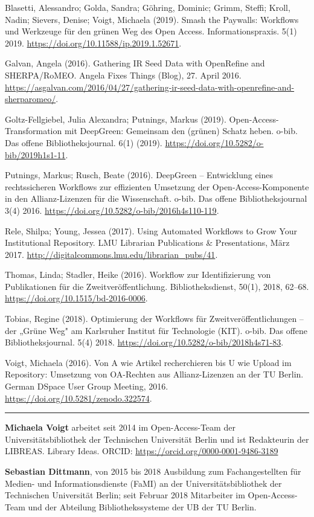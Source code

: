 \documentclass[a4paper,
fontsize=11pt,
oneside,
numbers=noperiodatend,
parskip=half-,
bibliography=totoc,
final
]{scrartcl}
\begin{document}
Blasetti, Alessandro; Golda, Sandra; Göhring, Dominic; Grimm, Steffi;
Kroll, Nadin; Sievers, Denise; Voigt, Michaela (2019). Smash the
Paywalls: Workflows und Werkzeuge für den grünen Weg des Open Access.
Informationspraxis. 5(1) 2019.
\url{https://doi.org/10.11588/ip.2019.1.52671}.

Galvan, Angela (2016). Gathering IR Seed Data with OpenRefine and
SHERPA/RoMEO. Angela Fixes Things (Blog), 27. April 2016.
\url{https://asgalvan.com/2016/04/27/gathering-ir-seed-data-with-openrefine-and-sherparomeo/}.

Goltz-Fellgiebel, Julia Alexandra; Putnings, Markus (2019).
Open-Access-Transformation mit DeepGreen: Gemeinsam den (grünen) Schatz
heben. o-bib. Das offene Bibliotheksjournal. 6(1) (2019).
\url{https://doi.org/10.5282/o-bib/2019h1s1-11}.

Putnings, Markus; Rusch, Beate (2016). DeepGreen -- Entwicklung eines
rechtssicheren Workflows zur effizienten Umsetzung der
Open-Access-Komponente in den Allianz-Lizenzen für die Wissenschaft.
o-bib. Das offene Bibliotheksjournal 3(4) 2016.
\url{https://doi.org/10.5282/o-bib/2016h4s110-119}.

Rele, Shilpa; Young, Jessea (2017). Using Automated Workflows to Grow
Your Institutional Repository. LMU Librarian Publications \&
Presentations, März 2017.
\url{http://digitalcommons.lmu.edu/librarian_pubs/41}.

Thomas, Linda; Stadler, Heike (2016). Workflow zur Identifizierung von
Publikationen für die Zweitveröffentlichung. Bibliotheksdienst, 50(1),
2018, 62--68. \url{https://doi.org/10.1515/bd-2016-0006}.

Tobias, Regine (2018). Optimierung der Workflows für
Zweitveröffentlichungen -- der „Grüne Weg" am Karlsruher Institut für
Technologie (KIT). o-bib. Das offene Bibliotheksjournal. 5(4) 2018.
\url{https://doi.org/10.5282/o-bib/2018h4s71-83}.

Voigt, Michaela (2016). Von A wie Artikel recherchieren bis U wie Upload
im Repository: Umsetzung von OA-Rechten aus Allianz-Lizenzen an der TU
Berlin. German DSpace User Group Meeting, 2016.
\url{https://doi.org/10.5281/zenodo.322574}.

\begin{center}\rule{0.5\linewidth}{\linethickness}\end{center}

\textbf{Michaela Voigt} arbeitet seit 2014 im Open-Access-Team der
Universitätsbibliothek der Technischen Universität Berlin und ist
Redakteurin der LIBREAS. Library Ideas. ORCID:
\url{https://orcid.org/0000-0001-9486-3189}

\textbf{Sebastian Dittmann}, von 2015 bis 2018 Ausbildung zum
Fachangestellten für Medien- und Informationsdienste (FaMI) an der
Universitätsbibliothek der Technischen Universität Berlin; seit Februar
2018 Mitarbeiter im Open-Access-Team und der Abteilung
Bibliothekssysteme der UB der TU Berlin.
\end{document}
